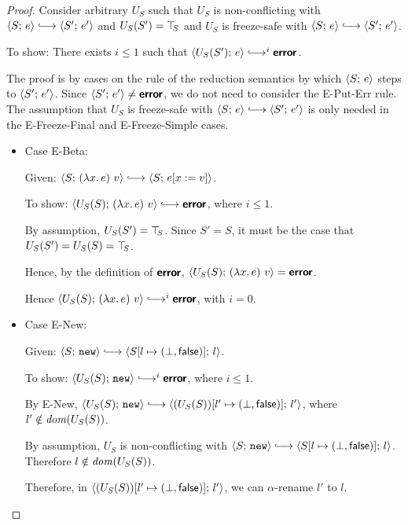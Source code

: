 \begin{proof}
  Consider arbitrary $U_S$ such that $U_S$ is non-conflicting with
  $\config{S}{e} \parstepsto \config{S'}{e'}$ and $U_S(S') = \top\hspace{-0.85mm}_{S}$
  and $U_S$ is freeze-safe with $\config{S}{e} \parstepsto
  \config{S'}{e'}$.

  To show: There exists $i \leq 1$ such that $\config{U_S(S')}{e}
  \parstepsto^i \error$.

  The proof is by cases on the rule of the reduction semantics by
  which $\langle S;\, e \rangle$ steps to $\langle S';\, e' \rangle$.  Since
  $\langle S';\, e' \rangle \neq \textbf{\textsf{error}}$, we do not need to consider the {\sc
    E-Put-Err} rule.  The assumption that $U_S$ is freeze-safe with
  $\config{S}{e} \parstepsto \config{S'}{e'}$ is only needed in the
  {\sc E-Freeze-Final} and {\sc E-Freeze-Simple} cases.

  \begin{itemize}

  \item Case {\sc E-Beta}:

    Given: $\config{S}{\app{(\lam{x}{e})}{v}} \parstepsto
    \config{S}{\subst{e}{x}{v}}$.

    To show: $\config{U_S(S)}{\app{(\lam{x}{e})}{v}} \parstepsto
    \error$, where $i \leq 1$.

    By assumption, $U_S(S') = \top\hspace{-0.85mm}_{S}$.  Since $S' = S$, it must be the
    case that $U_S(S') = U_S(S) = \top\hspace{-0.85mm}_{S}$.

    Hence, by the definition of $\textbf{\textsf{error}}$,
    $\langle U_S(S);\, (\lambda x.\,e)~v \rangle = \textbf{\textsf{error}}$.

    Hence $\config{U_S(S)}{\app{(\lam{x}{e})}{v}} \parstepsto^i
    \error$, with $i = 0$.

  \item Case {\sc E-New}:

    Given: $\config{S}{\NEW} \parstepsto
    \config{\extS{S}{l}{\bot}{\frozenfalse}}{l}$.

    To show: $\config{U_S(S)}{\NEW} \parstepsto^i \error$, where $i
    \leq 1$.

    By {\sc E-New}, $\config{U_S(S)}{\NEW} \parstepsto
    \config{\extS{(U_S(S))}{l'}{\bot}{\frozenfalse}}{l'}$, where $l'
    \notin \mathit{dom}(U_S(S))$.

    By assumption, $U_S$ is non-conflicting with $\config{S}{\NEW}
    \parstepsto \config{\extS{S}{l}{\bot}{\frozenfalse}}{l}$.
    Therefore $l \notin \mathit{dom}(U_S(S))$.

    Therefore, in
    $\langle (U_S(S))[l' \mapsto (\bot, \textsf{false})];\, l' \rangle$, we
    can $\alpha$-rename $l'$ to $l$.


\end{itemize}
\end{proof}
